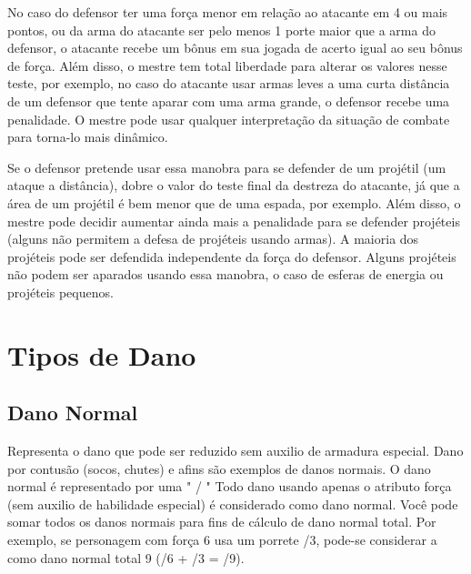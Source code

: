 No caso do defensor ter uma força menor em relação ao atacante em 4 ou mais pontos, ou da arma do atacante ser pelo menos 1 porte maior que a arma do defensor, o atacante recebe um bônus em sua jogada de acerto igual ao seu bônus de força. Além disso, o mestre tem total liberdade para alterar os valores nesse teste, por exemplo, no caso do atacante usar armas leves a uma curta distância de um defensor que tente aparar com uma arma grande, o defensor recebe uma penalidade. O mestre pode usar qualquer interpretação da situação de combate para torna-lo mais dinâmico.
	
	
Se o defensor pretende usar essa manobra para se defender de um projétil (um ataque a distância), dobre o valor do teste final da destreza do atacante, já que a área de um projétil é bem menor que de uma espada, por exemplo. Além disso, o mestre pode decidir aumentar ainda mais a penalidade para se defender projéteis (alguns não permitem a defesa de projéteis usando armas). A maioria dos projéteis pode ser defendida independente da força do defensor. Alguns projéteis não podem ser aparados usando essa manobra, o caso de esferas de energia ou projéteis pequenos.

 
\section{Tipos de Dano}

\subsection{Dano Normal}

Representa o dano que pode ser reduzido sem auxilio de armadura especial. Dano por contusão (socos, chutes) e afins são exemplos de danos normais. O dano normal é representado por uma " / " 
	Todo dano usando apenas o atributo força (sem auxilio de habilidade especial) é considerado como dano normal. Você pode somar todos os danos normais para fins de cálculo de dano normal total. Por exemplo, se personagem com força 6 usa um porrete /3, pode-se considerar a como dano normal total 9 (/6 + /3 = /9).


